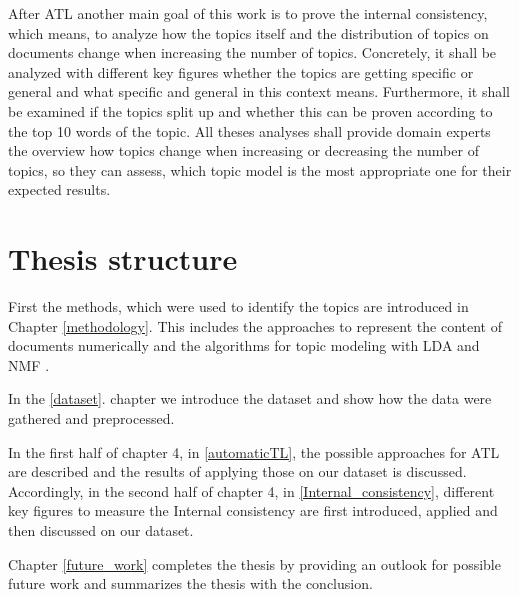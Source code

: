 After \ac{ATL} another main goal of this work is to prove the internal consistency, which means, to analyze how the topics itself and the distribution of topics on documents change when increasing the number of topics. Concretely, it shall be analyzed with different key figures whether the topics are getting specific or general and what specific and general in this context means. Furthermore, it shall be examined if the topics split up and whether this can be proven according to the top 10 words of the topic. All theses analyses shall provide domain experts the overview how topics change when increasing or decreasing the number of topics, so they can assess, which topic model is the most appropriate one for their expected results.
\section{Thesis structure}
First the methods, which were used to identify the topics are introduced in Chapter \ref{methodology}. This includes the approaches to represent the content of documents numerically and the algorithms for topic modeling with \acf{LDA} and \acf{NMF} .

In the \ref{dataset}. chapter we introduce the dataset and show how the data were gathered and preprocessed.

In the first half of chapter 4, in \ref{automaticTL}, the possible approaches for \acl{ATL} are described and the results of applying those on our dataset is discussed. Accordingly, in the second half of chapter 4, in \ref{Internal_consistency}, different key figures to measure the Internal consistency are first introduced, applied and then discussed on our dataset.

Chapter \ref{future_work} completes the thesis by providing an outlook for possible future work and summarizes the thesis with the conclusion.

\newpage